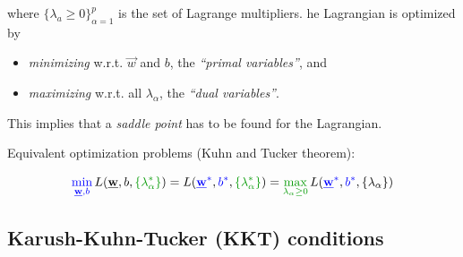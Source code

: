 \begin{frame}


where $\{\lambda_{a} \ge 0\}_{\alpha=1}^{p}$ is the set of Lagrange multipliers. he Lagrangian is optimized by
\begin{itemize}
\item[] \emph{minimizing} w.r.t. $\vec w$ and $b$, the \emph{``primal variables''}, and 
\item[] \emph{maximizing} w.r.t. all $\lambda_{\alpha}$, the \emph{``dual variables''}.
\end{itemize}

\slidesonly{\vspace{5mm}}
This implies that a \emph{saddle point} has to be found for the Lagrangian.
\slidesonly{\vspace{5mm}}

Equivalent optimization problems (Kuhn and Tucker theorem):

\begin{equation}
		{\color{blue}\min_{\vec w, b}}\, L{(\vec{w}, b, {\color{darkgreen} \{ \lambda_\alpha^*\}})}
		= L{({\color{blue}\vec{w}^*}, {\color{blue}b^*}, {\color{darkgreen} \{ \lambda_\alpha^*\}})}
		= {\color{darkgreen}\max_{ \lambda_\alpha \geq 0}}\, L{({\color{blue}\vec{w}^*}, {\color{blue}b^*}, \{ \lambda_\alpha \})}
\end{equation}

\end{frame}


\subsection{Karush-Kuhn-Tucker (KKT) conditions}

